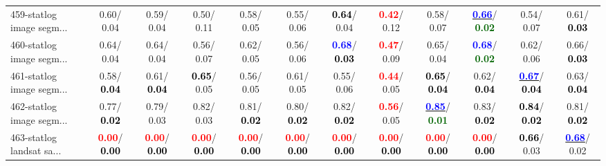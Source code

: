 \begin{table}[h]
\begin{center}
{\begin{tabular}{lc|c|c|c|c|c|c|c|c|c|c}
459-statlog image segm... &   0.60/  0.04 &   0.59/  0.04 &   0.50/  0.11 &   0.58/  0.05 &   0.55/  0.06 & \textcolor{black}{\textbf{  0.64}}/  0.04 & \textcolor{red}{\textbf{  0.42}}/  0.12 &   0.58/  0.07 & \underline{\textcolor{blue}{\textbf{  0.66}}}/\textcolor{darkgreen}{\textbf{  0.02}} &   0.54/  0.07 &   0.61/\textcolor{black}{\textbf{  0.03}} \\
460-statlog image segm... &   0.64/  0.04 &   0.64/  0.04 &   0.56/  0.07 &   0.62/  0.05 &   0.56/  0.06 & \textcolor{blue}{\textbf{  0.68}}/\textcolor{black}{\textbf{  0.03}} & \textcolor{red}{\textbf{  0.47}}/  0.09 &   0.65/  0.04 & \textcolor{blue}{\textbf{  0.68}}/\textcolor{darkgreen}{\textbf{  0.02}} &   0.62/  0.06 &   0.66/\textcolor{black}{\textbf{  0.03}} \\
461-statlog image segm... &   0.58/\textcolor{black}{\textbf{  0.04}} &   0.61/\textcolor{black}{\textbf{  0.04}} & \textcolor{black}{\textbf{  0.65}}/  0.05 &   0.56/  0.05 &   0.61/  0.05 &   0.55/  0.06 & \textcolor{red}{\textbf{  0.44}}/  0.05 & \textcolor{black}{\textbf{  0.65}}/\textcolor{black}{\textbf{  0.04}} &   0.62/\textcolor{black}{\textbf{  0.04}} & \underline{\textcolor{blue}{\textbf{  0.67}}}/\textcolor{black}{\textbf{  0.04}} &   0.63/\textcolor{black}{\textbf{  0.04}} \\
462-statlog image segm... &   0.77/\textcolor{black}{\textbf{  0.02}} &   0.79/  0.03 &   0.82/  0.03 &   0.81/\textcolor{black}{\textbf{  0.02}} &   0.80/\textcolor{black}{\textbf{  0.02}} &   0.82/\textcolor{black}{\textbf{  0.02}} & \textcolor{red}{\textbf{  0.56}}/  0.05 & \underline{\textcolor{blue}{\textbf{  0.85}}}/\textcolor{darkgreen}{\textbf{  0.01}} &   0.83/\textcolor{black}{\textbf{  0.02}} & \textcolor{black}{\textbf{  0.84}}/\textcolor{black}{\textbf{  0.02}} &   0.81/\textcolor{black}{\textbf{  0.02}} \\ \hline
463-statlog landsat sa... & \textcolor{red}{\textbf{  0.00}}/\textcolor{black}{\textbf{  0.00}} & \textcolor{red}{\textbf{  0.00}}/\textcolor{black}{\textbf{  0.00}} & \textcolor{red}{\textbf{  0.00}}/\textcolor{black}{\textbf{  0.00}} & \textcolor{red}{\textbf{  0.00}}/\textcolor{black}{\textbf{  0.00}} & \textcolor{red}{\textbf{  0.00}}/\textcolor{black}{\textbf{  0.00}} & \textcolor{red}{\textbf{  0.00}}/\textcolor{black}{\textbf{  0.00}} & \textcolor{red}{\textbf{  0.00}}/\textcolor{black}{\textbf{  0.00}} & \textcolor{red}{\textbf{  0.00}}/\textcolor{black}{\textbf{  0.00}} & \textcolor{red}{\textbf{  0.00}}/\textcolor{black}{\textbf{  0.00}} & \textcolor{black}{\textbf{  0.66}}/  0.03 & \underline{\textcolor{blue}{\textbf{  0.68}}}/  0.02 \\

\end{tabular}}
\end{center}
\end{table}
